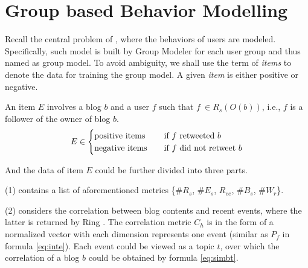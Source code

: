 \section{Group based Behavior Modelling}
\label{sec:gm}


Recall the central problem of \sys{}, where the \retg{} behaviors of users are modeled.
Specifically, such model is built by Group Modeler for each user group and thus named as group model.
To avoid ambiguity, we shall use the term of \textit{items} to denote the data for training the group model.
A given \textit{item} is either positive or negative.

\begin{definition}
\label{def:gm-it}
An item $E$ involves a blog $b$ and a user $f$ such that $f\ \in R_s(O(b))$, i.e., $f$ is a follower of  the owner of blog $b$.
\begin{equation}
\label{eq:gm-it}
E \in
  \begin{cases}
    \text{positive items}       & \quad \text{if } f \text{ retweeted{} } b\\
    \text{negative items}  		& \quad \text{if } f \text{ did not retweet{} } b
  \end{cases}
\end{equation}
\end{definition}

And the data of item $E$ could be further divided into three parts.

	\stab(1)  contains a list of aforementioned metrics \{\#$R_s$, \#$E_s$, $R_{ee}$, \#$B_s$, \#$W_r$\}.
	
	\stab(2)  considers the correlation between blog contents and recent events, where the latter is returned by Ring \cite{IEEEexample:ring}. The correlation metric $C_h$ is in the form of a normalized vector with each dimension represents one event (similar as $P_f$ in formula \ref{eq:inte}). Each event could be viewed as a topic $t$, over which the correlation of a blog $b$ could be obtained by formula \ref{eq:simbt}.
	
